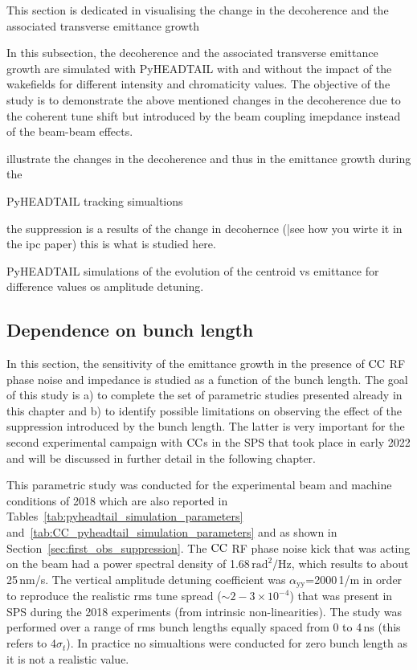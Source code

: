 This section is dedicated in visualising the change in the decoherence and the associated transverse emittance growth 


In this subsection, the decoherence and the associated transverse emittance growth are simulated with PyHEADTAIL with and without the impact of the wakefields for different intensity and chromaticity values. The objective of the study is to demonstrate the above mentioned changes in the decoherence due to the coherent tune shift but introduced by the beam coupling imepdance instead of the beam-beam effects.

illustrate the changes in the decoherence and thus in the emittance growth during the 

PyHEADTAIL tracking simualtions 


the suppression is a results of the change in decohernce (|see how you wirte it in the ipc paper)
this is what is studied here.

PyHEADTAIL simulations of the evolution of the centroid vs emittance for difference values os amplitude detuning. 

\subsection{Dependence on bunch length}

In this section, the sensitivity of the emittance growth in the presence of ${\mathrm{CC}}$ RF phase noise and impedance is studied as a function of the bunch length. The goal of this study is a) to complete the set of parametric studies presented already in this chapter and b) to identify possible limitations on observing the effect of the suppression introduced by the bunch length. The latter is very important for the second experimental campaign with ${\mathrm{CC}}$s in the SPS that took place in early 2022 and will be discussed in further detail in the following chapter.

This parametric study was conducted for the experimental beam and machine conditions of 2018 which are also reported in Tables~\ref{tab:pyheadtail_simulation_parameters} and~\ref{tab:CC_pyheadtail_simulation_parameters} and as shown in Section~\ref{sec:first_obs_suppression}. The ${\mathrm{CC}}$ RF phase noise kick that was acting on the beam had a power spectral density of 1.68\,$\mathrm{rad^2/Hz}$, which results to about 25\,nm/s. The vertical amplitude detuning coefficient was  $\alpha_\mathrm{yy}$=2000\,1/m in order to reproduce the realistic rms tune spread ($\sim 2-3 \times 10^{-4}$) that was present in SPS during the 2018 experiments (from intrinsic non-linearities). The study was performed over a range of rms bunch lengths equally spaced from 0 to 4\,ns (this refers to 4$\sigma_t$). In practice no simualtions were conducted for zero bunch length as it is not a realistic value.


